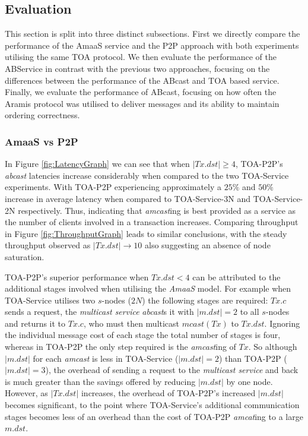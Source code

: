 	\clearpage
    \subsection{Evaluation}\label{ssec:emulated_eval}
    This section is split into three distinct subsections.  First we directly compare the performance of the \textsf{AmaaS} service and the P2P approach with both experiments utilising the same TOA protocol.  We then evaluate the performance of the ABService in contrast with the previous two approaches, focusing on the differences between the performance of the ABcast and TOA based service.  Finally, we evaluate the performance of \textsf{ABcast}, focusing on how often the \textsf{Aramis} protocol was utilised to deliver messages and its ability to maintain ordering correctness.  
    
    \subsubsection*{AmaaS vs P2P}
	In Figure \ref{fig:LatencyGraph} we can see that when $|Tx.dst| \geq 4$, TOA-P2P's \emph{abcast} latencies increase considerably when compared to the two TOA-Service experiments.  With TOA-P2P experiencing approximately a $25\%$ and $50\%$ increase in average latency when compared to TOA-Service-3N and TOA-Service-2N respectively.  Thus, indicating that \emph{amcast}ing is best provided as a service as the number of clients involved in a transaction increases. Comparing throughput in Figure \ref{fig:ThroughputGraph} leads to similar conclusions, with the steady throughput observed as $|Tx.dst| \rightarrow 10$ also suggesting an absence of node saturation.  
	
	TOA-P2P's superior performance when $Tx.dst < 4$ can be attributed to the additional stages involved when utilising the \emph{AmaaS} model.  For example when TOA-Service utilises two $s$-nodes ($2N$) the following stages are required: $Tx.c$ sends a request, the \emph{multicast service} \emph{abcast}s it with $|m.dst| = 2$ to all $s$-nodes and returns it to $Tx.c$, who must then multicast $mcast(Tx)$ to $Tx.dst$.  Ignoring the individual message cost of each stage the total number of stages is four, whereas in TOA-P2P the only step required is the \emph{amcast}ing of $Tx$.  So although $|m.dst|$ for each \emph{amcast} is less in TOA-Service ($|m.dst| = 2$) than TOA-P2P ($|m.dst| = 3$), the overhead of sending a request to the \emph{multicast service} and back is much greater than the savings offered by reducing $|m.dst|$ by one node.  However, as $|Tx.dst|$ increases, the overhead of TOA-P2P's increased $|m.dst|$ becomes significant, to the point where TOA-Service's additional communication stages becomes less of an overhead than the cost of TOA-P2P \emph{amcat}ing to a large $m.dst$.  
	
